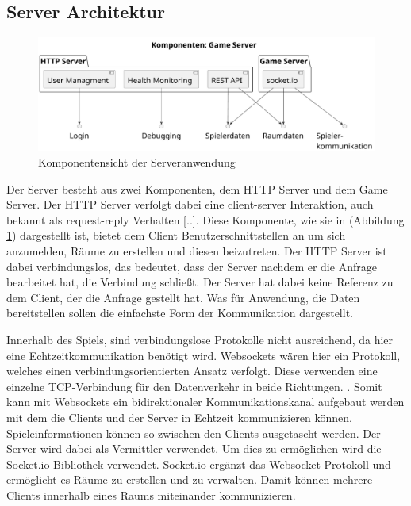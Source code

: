 \documentclass[
]{article}
\begin{document}
\subsection{Server Architektur}
\begin{figure}[H]
	\centering
	\includegraphics[width=\textwidth ]{resources/game_server.pdf}
	\caption{Komponentensicht der Serveranwendung}
	\label{fig:server}
\end{figure}

Der Server besteht aus zwei Komponenten, dem HTTP Server und dem Game Server.
Der HTTP Server verfolgt dabei eine \glqq  [..] client-server Interaktion, auch bekannt als 
request-reply Verhalten [..]\grqq{}\cite[S.37 ff.]{tanenbaum2007distributed}.
Diese Komponente, wie sie in (Abbildung \ref{fig:server}) dargestellt ist,
bietet dem Client Benutzerschnittstellen an um sich anzumelden, Räume zu erstellen und diesen beizutreten.
Der HTTP Server ist dabei verbindungslos, das bedeutet, 
dass der Server nachdem er die Anfrage bearbeitet hat, die Verbindung schließt.
Der Server hat dabei keine Referenz zu dem Client, der die Anfrage gestellt hat.
Was für Anwendung, die Daten bereitstellen sollen die einfachste Form der Kommunikation dargestellt.

Innerhalb des Spiels, sind verbindungslose Protokolle nicht ausreichend, da hier eine Echtzeitkommunikation benötigt wird.
Websockets wären hier ein Protokoll, welches einen verbindungsorientierten Ansatz verfolgt.
Diese \glqq [..] verwenden eine einzelne TCP-Verbindung für den Datenverkehr in beide Richtungen. 
\grqq{} \cite[Kapitel 1.1]{rfc-websocket}.
Somit kann mit Websockets ein bidirektionaler Kommunikationskanal aufgebaut werden mit dem die Clients 
und der Server in Echtzeit kommunizieren können.
Spieleinformationen können so zwischen den Clients ausgetascht werden. 
Der Server wird dabei als Vermittler verwendet. Um dies zu ermöglichen wird die Socket.io Bibliothek verwendet.
Socket.io ergänzt das Websocket Protokoll und ermöglicht es Räume zu erstellen und zu verwalten.
Damit können mehrere Clients innerhalb eines Raums miteinander kommunizieren.
\end{document}
